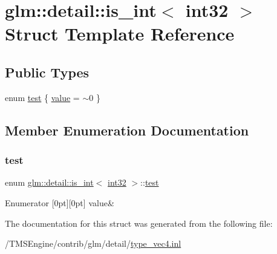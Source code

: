 \hypertarget{structglm_1_1detail_1_1is__int_3_01int32_01_4}{}\section{glm\+:\+:detail\+:\+:is\+\_\+int$<$ int32 $>$ Struct Template Reference}
\label{structglm_1_1detail_1_1is__int_3_01int32_01_4}
\subsection*{Public Types}
\begin{DoxyCompactItemize}
\item 
enum \hyperlink{structglm_1_1detail_1_1is__int_3_01int32_01_4_ad400146c56b42f07c8c14c71c5f7322f}{test} \{ \hyperlink{structglm_1_1detail_1_1is__int_3_01int32_01_4_ad400146c56b42f07c8c14c71c5f7322fa24dfcabf3ede34dbfc990ec0c0ed4264}{value} = $\sim$0
 \}
\end{DoxyCompactItemize}


\subsection{Member Enumeration Documentation}
\mbox{\label{structglm_1_1detail_1_1is__int_3_01int32_01_4_ad400146c56b42f07c8c14c71c5f7322f}} 
\subsubsection{\texorpdfstring{test}{test}}
{\footnotesize\ttfamily enum \hyperlink{structglm_1_1detail_1_1is__int}{glm\+::detail\+::is\+\_\+int}$<$ \hyperlink{namespaceglm_1_1detail_a9f85b4efeca416cdcec2fd08939a2e17}{int32} $>$\+::\hyperlink{structglm_1_1detail_1_1is__int_3_01int32_01_4_ad400146c56b42f07c8c14c71c5f7322f}{test}}

\begin{DoxyEnumFields}{Enumerator}
[0pt][0pt]{}\mbox{\label{structglm_1_1detail_1_1is__int_3_01int32_01_4_ad400146c56b42f07c8c14c71c5f7322fa24dfcabf3ede34dbfc990ec0c0ed4264}} 
value&\\
\hline

\end{DoxyEnumFields}


The documentation for this struct was generated from the following file\+:\begin{DoxyCompactItemize}
\item 
/\+T\+M\+S\+Engine/contrib/glm/detail/\hyperlink{type__vec4_8inl}{type\+\_\+vec4.\+inl}\end{DoxyCompactItemize}
